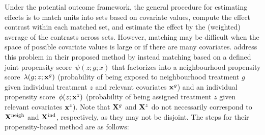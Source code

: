 \documentclass[10pt]{article}
\begin{document}
Under the potential outcome framework, the general procedure for estimating effects is to match units into sets based on covariate values, compute the effect contrast within each matched set, and estimate the effect by the (weighted) average of the contrasts across sets. However, matching may be difficult when the space of possible covariate values is large or if there are many covariates. \textcite{Forastiere:2021} address this problem in their proposed method by instead matching based on a defined joint propensity score~$\psi(z;g;x)$ that factorizes into a neighbourhood propensity score~$\lambda(g;z;\mathbf{x}^g)$ (probability of being exposed to neighbourhood treatment $g$ given individual treatment $z$ and relevant covariates $\mathbf{x}^g$) and an individual propensity score~$\phi(z;\mathbf{x}^z)$ (probability of being assigned treatment $z$ given relevant covariates $\mathbf{x}^z$). Note that $\mathbf{X}^g$ and $\mathbf{X}^z$ do not necessarily correspond to $\mathbf{X}^{\text{neigh}}$ and $\mathbf{X}^{\text{ind}}$, respectively, as they may not be disjoint. The steps for their propensity-based method are as follows:
\end{document}

